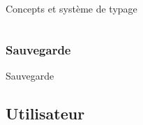 \documentclass[8pt]{beamer}
\begin{document}
\begin{frame}{Concepts et système de typage}
\begin{columns}
\begin{column}{6cm}
\end{column}

\end{columns}
\end{frame}





\subsubsection{Sauvegarde}
\begin{frame}{Sauvegarde}
\end{frame}


\subsection{Utilisateur}
\end{document}
